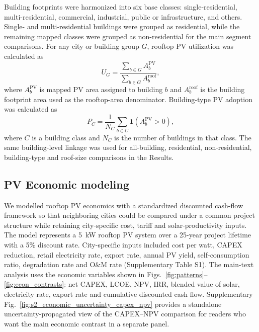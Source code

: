 \documentclass[pdflatex,sn-nature]{sn-jnl}
\begin{document}
Building footprints were harmonized into six base classes: single-residential, multi-residential, commercial, industrial, public or infrastructure, and others. Single- and multi-residential buildings were grouped as residential, while the remaining mapped classes were grouped as non-residential for the main segment comparisons. For any city or building group $G$, rooftop PV utilization was calculated as
\begin{equation}
U_{G}=\frac{\sum_{b\in G} A^{\mathrm{PV}}_{b}}{\sum_{b\in G} A^{\mathrm{roof}}_{b}},
\end{equation}
where $A^{\mathrm{PV}}_{b}$ is mapped PV area assigned to building $b$ and $A^{\mathrm{roof}}_{b}$ is the building footprint area used as the rooftop-area denominator. Building-type PV adoption was calculated as
\begin{equation}
P_{C}=\frac{1}{N_{C}}\sum_{b\in C}\mathbf{1}\left(A^{\mathrm{PV}}_{b}>0\right),
\end{equation}
where $C$ is a building class and $N_{C}$ is the number of buildings in that class. The same building-level linkage was used for all-building, residential, non-residential, building-type and roof-size comparisons in the Results.

\subsection{PV Economic modeling}

We modelled rooftop PV economics with a standardized discounted cash-flow framework so that neighboring cities could be compared under a common project structure while retaining city-specific cost, tariff and solar-productivity inputs. The model represents a 5~kW rooftop PV system over a 25-year project lifetime with a 5\% discount rate. City-specific inputs included cost per watt, CAPEX reduction, retail electricity rate, export rate, annual PV yield, self-consumption ratio, degradation rate and O\&M rate (Supplementary Table S1). The main-text analysis uses the economic variables shown in Figs.~\ref{fig:patterns}--\ref{fig:econ_contrasts}: net CAPEX, LCOE, NPV, IRR, blended value of solar, electricity rate, export rate and cumulative discounted cash flow. Supplementary Fig.~\ref{fig:s2_economic_uncertainty_capex_npv} provides a standalone uncertainty-propagated view of the CAPEX--NPV comparison for readers who want the main economic contrast in a separate panel.
\end{document}
